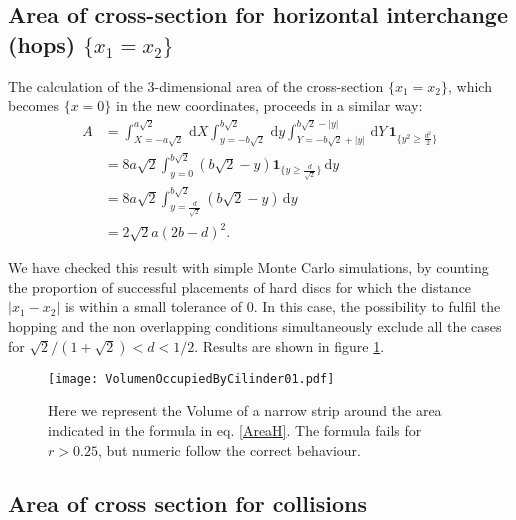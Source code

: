 \documentclass[a4paper,10pt]{article}
\newcommand{\rd}{\, \mathrm{d}}
\newcommand{\indicator}[1]{\mathbf{1}_{ \{   #1 \} } }
\begin{document}
\subsection{Area of cross-section for horizontal interchange (hops) $\{x_1 = x_2\}$}
The calculation of the $3$-dimensional area of the cross-section 
$\{x_1 = x_2\}$, which becomes 
$\{ x=0 \}$ in the new coordinates, proceeds in a similar way:
\begin{align}
 A &= \int_{X=-a \sqrt{2} }^{a \sqrt{2}}  \rd X
 \int_{y=-b \sqrt{2}}^{b \sqrt{2}} \rd y
\int_{Y=-b \sqrt{2} + |y| }^{b \sqrt{2}-|y|}  \rd Y
\, \indicator{y^2 \ge \frac{d^2}{2} } \\
&= 8 a \sqrt{2} \int_{y=0}^{b \sqrt{2}} 
\left( b \sqrt{2} - y \right)  \indicator{y \ge \frac{d}{\sqrt{2}}}  \rd y \\
&= 8 a \sqrt{2} \int_{y= \frac{d}{\sqrt{2}}}^{b \sqrt{2}}  \left( b \sqrt{2} - y \right)  \rd y \\
&= 2 \sqrt{2} a ( 2b - d )^2. \label{AreaH}
\end{align}

We have checked this result with simple Monte Carlo simulations, 
by counting the proportion of successful placements of hard discs for which the distance 
$|x_1 - x_2|$ is within a small tolerance of $0$. In this case, the possibility to fulfil
the hopping and the non overlapping conditions simultaneously exclude 
all the cases for $\sqrt{2}/(1+\sqrt{2}) <d<1/2$. Results are shown in figure \ref{AreaHopp01}.

\begin{figure}
\centering
\texttt{[image: VolumenOccupiedByCilinder01.pdf]}
\caption{Here we represent the Volume of a narrow strip around the area
indicated in the formula in eq. \ref{AreaH}. The formula fails for $r>0.25$, but
numeric follow the correct behaviour. } 

\label{AreaHopp01}
\end{figure}


\subsection{Area of cross section for collisions}
\end{document}
